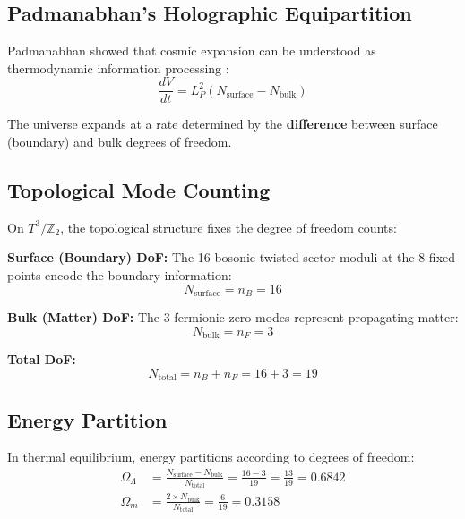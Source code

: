 \documentclass[12pt,a4paper]{article}
\newcommand{\Ztwo}{\mathbb{Z}_2}
\newcommand{\Tthree}{T^3}
\newcommand{\OmegaL}{\Omega_\Lambda}
\newcommand{\OmegaM}{\Omega_m}
\newcommand{\nB}{n_B}
\newcommand{\nF}{n_F}
\begin{document}
\subsection{Padmanabhan's Holographic Equipartition}

Padmanabhan showed that cosmic expansion can be understood as thermodynamic information processing \cite{Padmanabhan}:
\begin{equation}
\frac{dV}{dt} = L_P^2 (N_{\text{surface}} - N_{\text{bulk}})
\end{equation}

The universe expands at a rate determined by the \textbf{difference} between surface (boundary) and bulk degrees of freedom.

\subsection{Topological Mode Counting}

On $\Tthree/\Ztwo$, the topological structure fixes the degree of freedom counts:

\textbf{Surface (Boundary) DoF:} The 16 bosonic twisted-sector moduli at the 8 fixed points encode the boundary information:
\begin{equation}
N_{\text{surface}} = \nB = 16
\end{equation}

\textbf{Bulk (Matter) DoF:} The 3 fermionic zero modes represent propagating matter:
\begin{equation}
N_{\text{bulk}} = \nF = 3
\end{equation}

\textbf{Total DoF:}
\begin{equation}
N_{\text{total}} = \nB + \nF = 16 + 3 = 19
\end{equation}

\subsection{Energy Partition}

In thermal equilibrium, energy partitions according to degrees of freedom:
\begin{align}
\OmegaL &= \frac{N_{\text{surface}} - N_{\text{bulk}}}{N_{\text{total}}} = \frac{16 - 3}{19} = \frac{13}{19} = 0.6842 \\[0.5em]
\OmegaM &= \frac{2 \times N_{\text{bulk}}}{N_{\text{total}}} = \frac{6}{19} = 0.3158
\end{align}
\end{document}

